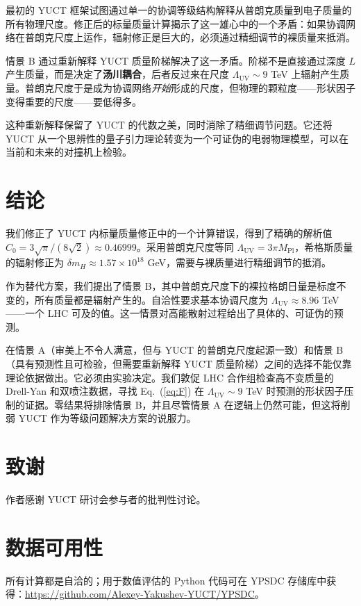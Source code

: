 \documentclass[11pt,a4paper]{article}
\newcommand{\Mpl}{M_{\mathrm{Pl}}}
\newcommand{\LUV}{\Lambda_{\mathrm{UV}}}
\theoremstyle{remark}
\begin{document}
	最初的 YUCT 框架试图通过单一的协调等级结构解释从普朗克质量到电子质量的所有物理尺度。修正后的标量质量计算揭示了这一雄心中的一个矛盾：如果协调网络在普朗克尺度上运作，辐射修正是巨大的，必须通过精细调节的裸质量来抵消。
	
	情景 B 通过重新解释 YUCT 质量阶梯解决了这一矛盾。阶梯不是直接通过深度 \(L\) 产生质量，而是决定了\textbf{汤川耦合}，后者反过来在尺度 \(\LUV \sim 9\) TeV 上辐射产生质量。普朗克尺度于是成为协调网络\textit{开始}形成的尺度，但物理的颗粒度——形状因子变得重要的尺度——要低得多。
	
	这种重新解释保留了 YUCT 的代数之美，同时消除了精细调节问题。它还将 YUCT 从一个思辨性的量子引力理论转变为一个可证伪的电弱物理模型，可以在当前和未来的对撞机上检验。
	
	\section{结论}
	\label{sec:conclusion}
	
	我们修正了 YUCT 内标量质量修正中的一个计算错误，得到了精确的解析值 \(C_0 = 3\sqrt{\pi}/(8\sqrt{2}) \approx 0.46999\)。采用普朗克尺度等同 \(\LUV = 3\pi\Mpl\)，希格斯质量的辐射修正为 \(\delta m_H \approx 1.57\times 10^{18}\) GeV，需要与裸质量进行精细调节的抵消。
	
	作为替代方案，我们提出了情景 B，其中普朗克尺度下的裸拉格朗日量是标度不变的，所有质量都是辐射产生的。自洽性要求基本协调尺度为 \(\LUV \approx 8.96\) TeV——一个 LHC 可及的值。这一情景对高能散射过程给出了具体的、可证伪的预测。
	
	在情景 A（审美上不令人满意，但与 YUCT 的普朗克尺度起源一致）和情景 B（具有预测性且可检验，但需要重新解释 YUCT 质量阶梯）之间的选择不能仅靠理论依据做出。它必须由实验决定。我们敦促 LHC 合作组检查高不变质量的 Drell-Yan 和双喷注数据，寻找 Eq.~(\ref{eq:F}) 在 \(\LUV \sim 9\) TeV 时预测的形状因子压制的证据。零结果将排除情景 B，并且尽管情景 A 在逻辑上仍然可能，但这将削弱 YUCT 作为等级问题解决方案的说服力。
	
	\section*{致谢}
	作者感谢 YUCT 研讨会参与者的批判性讨论。
	
	\section*{数据可用性}
	所有计算都是自洽的；用于数值评估的 Python 代码可在 YPSDC 存储库中获得：\url{https://github.com/Alexey-Yakushev-YUCT/YPSDC}。
	
\end{document}
